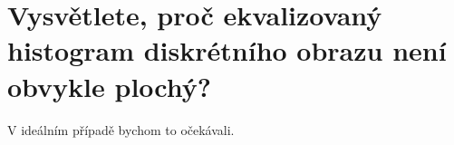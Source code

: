 \section{Vysvětlete, proč ekvalizovaný histogram diskrétního obrazu není obvykle plochý?}
V ideálním případě bychom to očekávali.